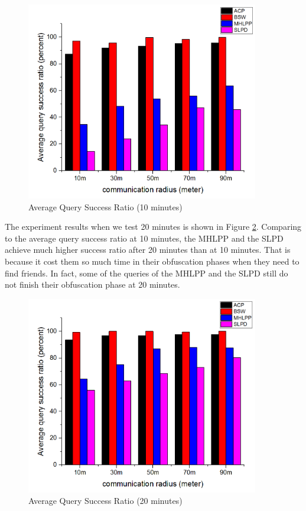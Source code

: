 \begin{figure} [H]
  \centering 
  \includegraphics[width=4.0in]{figures/F414AverageQuerySuccessRatio10minutes.png}
  \caption{Average Query Success Ratio (10 minutes)} 
  \label{fig:AverageQuerySuccessRatio10} %
\end{figure}

The experiment results when we test 20 minutes is shown in Figure \ref{fig:AverageQuerySuccessRatio20}. Comparing to the average query success ratio at 10 minutes, the MHLPP and the SLPD achieve much higher success ratio after 20 minutes than at 10 minutes. That is because it cost them so much time in their obfuscation phases when they need to find friends. In fact, some of the queries of the MHLPP and the SLPD still do not finish their obfuscation phase at 20 minutes.

\begin{figure} [H]
  \centering 
  \includegraphics[width=4.0in]{figures/F415AverageQuerySuccessRatio20minutes.png}
  \caption{Average Query Success Ratio (20 minutes)} 
  \label{fig:AverageQuerySuccessRatio20} %
\end{figure}

